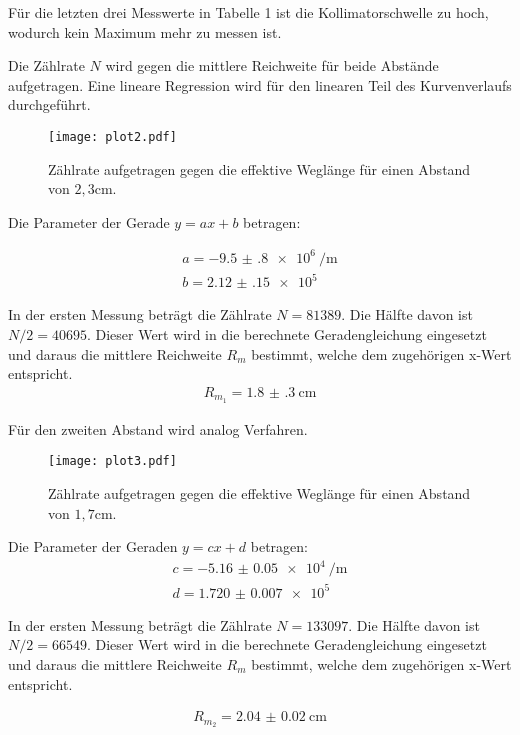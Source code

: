 Für die letzten drei Messwerte in Tabelle 1 ist die Kollimatorschwelle zu hoch, wodurch kein Maximum mehr zu messen ist.

Die Zählrate $N$ wird gegen die mittlere Reichweite für beide Abstände aufgetragen. Eine lineare Regression wird für den linearen Teil
des Kurvenverlaufs durchgeführt.

\begin{figure}[H]
  \centering
  \texttt{[image: plot2.pdf]}
  \caption{Zählrate aufgetragen gegen die effektive Weglänge für einen Abstand von $2,3$cm.}
  \label{fig:plot}
\end{figure}


Die Parameter der Gerade $y=ax + b$ betragen:

\begin{align*}
  a = \SI{-9.5(8)e6}{\per\meter} \\
  b = \SI{2.12(15)e5}{}
\end{align*}

In der ersten Messung beträgt die Zählrate $N =81389$. Die Hälfte davon ist $N/2 = 40695$. Dieser Wert wird in die berechnete Geradengleichung eingesetzt und
daraus die mittlere Reichweite $R_m$ bestimmt, welche dem zugehörigen x-Wert entspricht.
\begin{align*}
  R_{m_1} = \SI{1.8(3)}{\centi\meter}
\end{align*}


Für den zweiten Abstand wird analog Verfahren.

\begin{figure}[H]
  \centering
  \texttt{[image: plot3.pdf]}
  \caption{Zählrate aufgetragen gegen die effektive Weglänge für einen Abstand von $1,7$cm.}
  \label{fig:plot}
\end{figure}

Die Parameter der Geraden $y = cx+d$ betragen:
\begin{align*}
c = \SI{-5.16(5)e4}{\per\meter} \\
d = \SI{1.720(7)e5}{}
\end{align*}

In der ersten Messung beträgt die Zählrate $N =133097$. Die Hälfte davon ist $N/2 = 66549$. Dieser Wert wird in die berechnete Geradengleichung eingesetzt und
daraus die mittlere Reichweite $R_m$ bestimmt, welche dem zugehörigen x-Wert entspricht.

\begin{align*}
  R_{m_2} = \SI{2.04(2)}{\centi\meter}
\end{align*}

